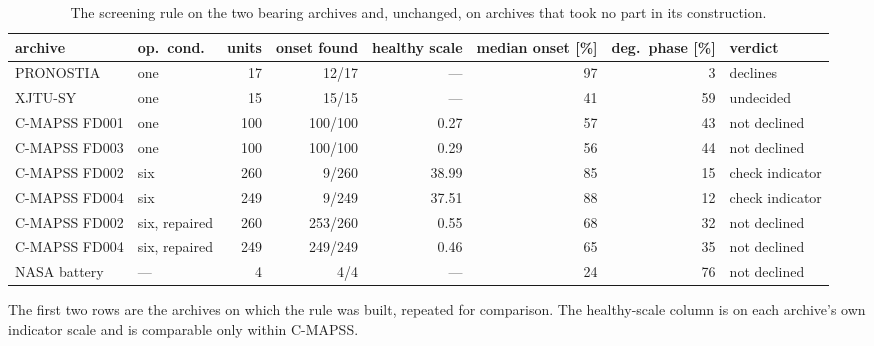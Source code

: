 \begin{table}[htbp]
\centering\small
\caption{The screening rule on the two bearing archives and, unchanged, on archives
that took no part in its construction.}
\label{tab:thirdset}
\begin{adjustbox}{max width=\linewidth}
\begin{tabular}{@{}l l r r r r r l@{}}
\toprule
archive & op.\ cond. & units & onset found & healthy scale
        & median onset [\%] & deg.\ phase [\%] & verdict\\
\midrule
PRONOSTIA & one & 17 & 12/17 & --- & 97 & 3 & declines\\
XJTU-SY & one & 15 & 15/15 & --- & 41 & 59 & undecided\\
\midrule
C-MAPSS FD001 & one & 100 & 100/100 & 0.27 & 57 & 43 & not declined\\
C-MAPSS FD003 & one & 100 & 100/100 & 0.29 & 56 & 44 & not declined\\
C-MAPSS FD002 & six & 260 & 9/260 & 38.99 & 85 & 15 & check indicator\\
C-MAPSS FD004 & six & 249 & 9/249 & 37.51 & 88 & 12 & check indicator\\
C-MAPSS FD002 & six, repaired & 260 & 253/260 & 0.55 & 68 & 32 & not declined\\
C-MAPSS FD004 & six, repaired & 249 & 249/249 & 0.46 & 65 & 35 & not declined\\
NASA battery & --- & 4 & 4/4 & --- & 24 & 76 & not declined\\
\bottomrule
\end{tabular}
\end{adjustbox}

\vspace{4pt}
\begin{minipage}{0.95\linewidth}\footnotesize
The first two rows are the archives on which the rule was built, repeated for
comparison. The healthy-scale column is on each archive's own indicator scale and
is comparable only within C-MAPSS.
\end{minipage}
\end{table}
